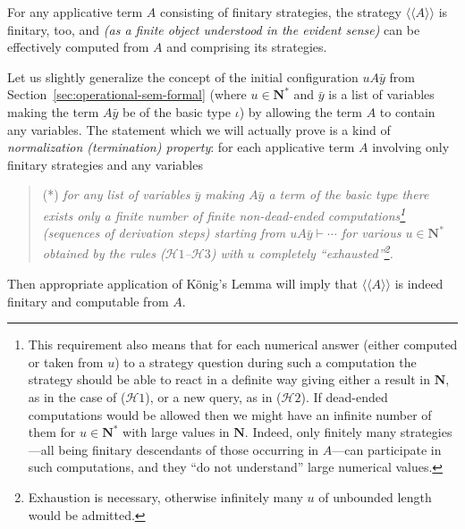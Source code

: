 \documentclass[fleqn]{LMCS}
\theoremstyle{plain}\newtheorem{satz}[thm]{Satz}
\theoremstyle{plain}\newtheorem{hyp}[thm]{Hypothesis}
\theoremstyle{plain}\newtheorem{hyps}[thm]{Hypotheses}
\theoremstyle{definition}\newtheorem{note}[thm]{Note}
\newcommand{\lla}{\langle\!\langle}
\newcommand{\rra}{\rangle\!\rangle}
\newcommand{\Osem}[1]{\lla #1 \rra}
\newcommand{\NN}{\mathbf{N}}
\newcommand{\HH}{{\mathcal H}}
\newcommand{\bY}{\bar{y}}
\newcommand{\?}{\mbox{?}}
\begin{document}
\begin{thm}\label{th:applications-of-finitary}
For any applicative term $A$ consisting of finitary strategies, the strategy 
$\Osem{A}$ is finitary, too, and\/ {\em(as a finite object understood in the evident sense)} 
can be effectively computed from $A$ and 
comprising its strategies. 
\end{thm}
\proof 
Let us slightly generalize the concept of the initial configuration $uA\bY$ 
from Section~\ref{sec:operational-sem-formal} 
(where $u\in\NN^*$ and $\bY$ is a list of variables making the term $A\bY$ 
be of the basic type $\iota$) 
by allowing the term $A$ to contain any variables.  
The statement which we will actually prove is a kind of 
\emph{normalization (termination) property}: 
for each applicative term $A$ involving only finitary strategies 
and any variables 
\begin{quotation}
(*) \emph{ for any list of variables $\bY$ making $A\bY$ a term of the basic type 
there exists only a finite number of finite non-dead-ended computations\footnote{This requirement also means that for each numerical answer 
(either computed or taken from $u$) 
to a strategy question during such a computation the strategy should be able 
to react in a definite way 
giving either a result in $\NN$, as in the case of 
($\HH1$), or a new query, as in ($\HH2$). 
If dead-ended computations would be allowed then we might have an infinite number of them 
for $u\in\NN^*$ with large values in $\NN$. 
Indeed, only finitely many strategies---all being finitary descendants 
of those occurring in $A$---can participate in such computations, 
and they ``do not understand'' large numerical values. 
}
(sequences of derivation steps) starting from 
\mbox{$uA\bY\vdash\cdots$} for various 
$u\in\NN^*$ obtained by the rules ($\HH1$--$\HH3$) with $u$ completely ``exhausted''\footnote{Exhaustion 
is necessary, otherwise infinitely many $u$ 
of unbounded length would be admitted.
}. 
}
\end{quotation}
Then appropriate application of K\"onig's Lemma will imply that $\Osem{A}$ is indeed 
finitary and computable from $A$. 
\end{document}

